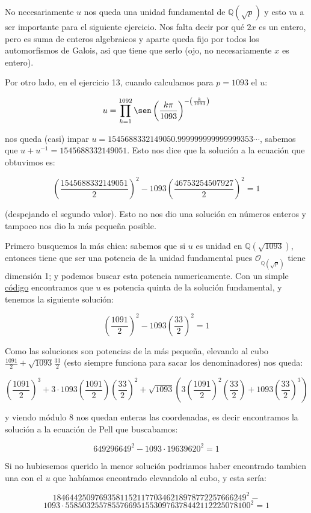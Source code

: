 \documentclass[12pt]{amsart}
\newcommand{\QQ}{\mathbb{Q}}
\newcommand{\OO}{\mathcal{O}}
\newcommand{\lp}{\left(}
\newcommand{\rp}{\right)}
\theoremstyle{plain}
\begin{document}
No necesariamente $u$
nos queda una unidad fundamental de $\QQ(\sqrt{p})$ y esto
va a ser importante para el siguiente ejercicio. Nos falta 
decir por qué $2x$ es un entero, pero es suma de 
enteros algebraicos y aparte queda fijo por todos los 
automorfismos de Galois, asi que tiene que serlo (ojo, no 
necesariamente $x$ es entero).

Por otro lado, en el ejercicio 13, cuando calculamos para 
$p=1093$ el $u$:

$$u= \prod^{1092}_{k=1} \sen\lp\frac{k\pi}{1093}\rp ^{-\lp
\frac{k}{1093} \rp}$$

nos queda (casi) impar $u = 1545688332149050.999999999999999353
\cdots$, sabemos que $u+u^{-1} = 1545688332149051$. Esto nos 
dice que la solución a la ecuación que obtuvimos es:

$$\lp\frac{1545688332149051}{2}\rp^2 - 1093 
\lp\frac{46753254507927}{2}\rp^2 = 1$$

(despejando el segundo valor). Esto no nos dio una solución 
en números enteros y tampoco nos dio la más pequeña posible.

Primero busquemos la más chica: sabemos que si $u$ es unidad 
en $\QQ(\sqrt{1093})$, entonces tiene que ser una potencia de 
la unidad fundamental pues $\OO_{\QQ(\sqrt{p})}$ tiene 
dimensión 1; y podemos buscar esta potencia numericamente.
Con un simple \hyperref[codigo3]{código} encontramos que $u$
es potencia quinta de la solución fundamental, y tenemos 
la siguiente solución:

$$\lp\frac{1091}{2}\rp^2 - 1093 \lp\frac{33}{2}\rp^2 = 1$$

Como las soluciones son potencias de la más pequeña,
elevando al cubo $\frac{1091}{2} + \sqrt{1093}
\frac{33}{2}$ (esto siempre funciona para sacar los 
denominadores) nos queda:

$$\lp\frac{1091}{2}\rp^3 +3\cdot1093
\lp\frac{1091}{2}\rp \lp\frac{33}{2}\rp^2 + \sqrt{1093} 
\lp 3\lp\frac{1091}{2}\rp^2\lp\frac{33}{2}\rp + 1093
\lp\frac{33}{2}\rp^3\rp$$

y viendo módulo 8 nos quedan enteras las coordenadas, es decir
encontramos la solución a la ecuación de Pell que buscabamos:

$$649296649^2 - 1093\cdot19639620^2 = 1$$

Si no hubiesemos querido la menor solución podriamos haber 
encontrado tambien una con el $u$ que habíamos encontrado
elevandolo al cubo, y esta sería:

$$1846442509769358115211770346218978772257666249^2 - $$
$$1093\cdot 55850325578557669515530976378442112225078100^2 = 1$$
\end{document}
